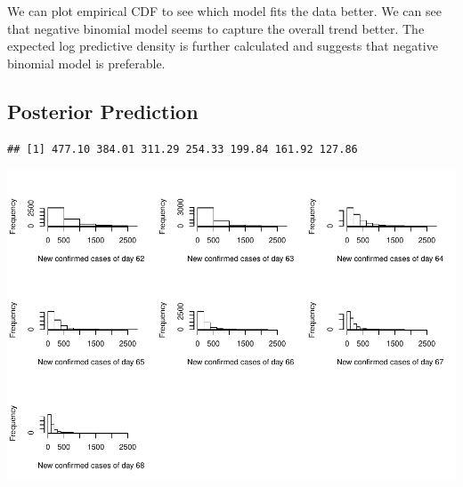 \documentclass[]{article}
\newenvironment{Shaded}{\begin{snugshade}}{\end{snugshade}}
\newcommand{\CommentTok}[1]{\textcolor[rgb]{0.56,0.35,0.01}{\textit{#1}}}
\newcommand{\ControlFlowTok}[1]{\textcolor[rgb]{0.13,0.29,0.53}{\textbf{#1}}}
\newcommand{\DataTypeTok}[1]{\textcolor[rgb]{0.13,0.29,0.53}{#1}}
\newcommand{\DecValTok}[1]{\textcolor[rgb]{0.00,0.00,0.81}{#1}}
\newcommand{\KeywordTok}[1]{\textcolor[rgb]{0.13,0.29,0.53}{\textbf{#1}}}
\newcommand{\NormalTok}[1]{#1}
\newcommand{\OperatorTok}[1]{\textcolor[rgb]{0.81,0.36,0.00}{\textbf{#1}}}
\newcommand{\StringTok}[1]{\textcolor[rgb]{0.31,0.60,0.02}{#1}}
\begin{document}
We can plot empirical CDF to see which model fits the data better. We
can see that negative binomial model seems to capture the overall trend
better. The expected log predictive density is further calculated and
suggests that negative binomial model is preferable.

\hypertarget{posterior-prediction}{%
\subsection{Posterior Prediction}\label{posterior-prediction}}

\begin{Shaded}
\end{Shaded}

\begin{verbatim}
## [1] 477.10 384.01 311.29 254.33 199.84 161.92 127.86
\end{verbatim}

\includegraphics{Assignment2_Yuyue_Hua_files/figure-latex/unnamed-chunk-9-1.pdf}
\end{document}
